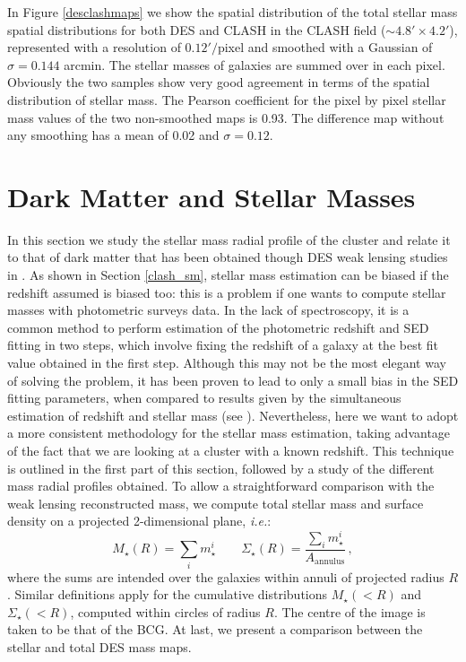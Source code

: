 {In Figure \ref{desclashmaps} we show the spatial distribution of the total stellar mass spatial distributions for both DES and CLASH in the CLASH field ($\sim 4.8'\times 4.2'$), represented with a resolution of $0.12'/$pixel and smoothed with a Gaussian of $\sigma=0.144$ arcmin. The stellar masses of galaxies are summed over in each pixel.
Obviously the two samples show very good agreement in terms of the spatial distribution of stellar mass. The Pearson coefficient for the pixel by pixel stellar mass values of the two non-smoothed maps is 0.93. The difference map without any smoothing has a mean of 0.02 and $\sigma=0.12$.

\section{Dark Matter and Stellar Masses}\label{DMandSM}
In this section we study the stellar mass radial profile of the cluster and relate it to that of dark matter that has been obtained though DES weak lensing studies in \citet{melchior}. As shown in Section \ref{clash_sm}, stellar mass estimation can be biased if the redshift assumed is biased too: this is a problem if one wants to compute stellar masses with photometric surveys data. In the lack of spectroscopy, it is a common method to perform estimation of the photometric redshift and SED fitting in two steps, which involve fixing the redshift of a galaxy at the best fit value obtained in the first step. Although this may not be the most elegant way of solving the problem, it has been proven to lead to only a small bias in the SED fitting parameters, when compared to results given by the simultaneous estimation of redshift and stellar mass (see \citealt{acquaviva}). Nevertheless, here we want to adopt a more consistent methodology for the stellar mass estimation, taking advantage of the fact that we are looking at a cluster with a known redshift. This technique is outlined in the first part of this section, followed by a study of the different mass radial profiles obtained. To allow a straightforward comparison with the weak lensing reconstructed mass, we compute total stellar mass and surface density on a projected 2-dimensional plane, \emph{i.e.}:
\begin{equation}
M_\star(R)=\sum_i m_\star^i \qquad\Sigma_\star(R)=\frac{\sum_i m_\star^i}{A_\mathrm{annulus}}\, ,
\end{equation}
where the sums are intended over the galaxies within annuli of projected radius $R$. Similar definitions apply for the cumulative distributions $M_\star(<R)$ and $\Sigma_\star(<R)$, computed within circles of radius $R$.  The centre of the image is taken to be that of the BCG. At last, we present a comparison between the stellar and total DES mass maps.


}
